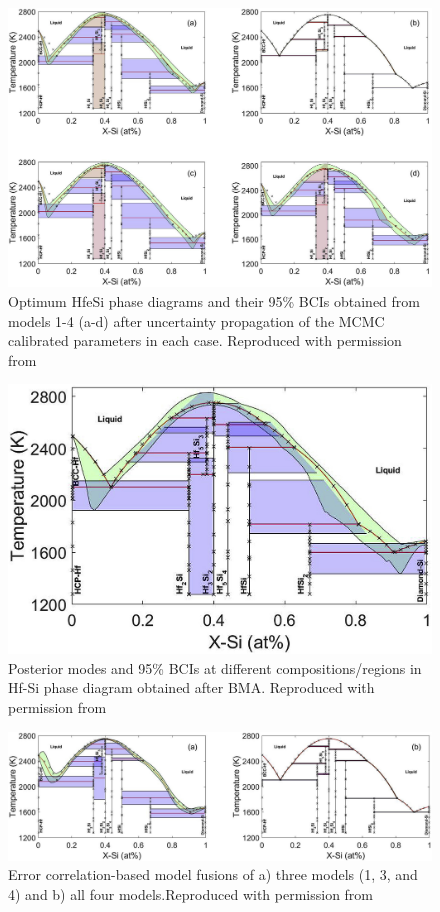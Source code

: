 \documentclass[utf8]{frontiersSCNS} %
\begin{document}
\begin{figure}[!]
\includegraphics[scale=1]{./figures/PD_4_MCMC}
\caption{Optimum HfeSi phase diagrams and their 95\% BCIs obtained from models 1-4 (a-d) after uncertainty propagation of the MCMC calibrated parameters in each case. Reproduced with permission from \cite{honarmandi2019bayesian}}
\label{fig:07}
\end{figure}

\begin{figure}[!]
\includegraphics[scale=1]{./figures/PD_BMA}
\caption{Posterior modes and 95\% BCIs at different compositions/regions in Hf-Si phase diagram obtained after BMA.
 Reproduced with permission from \cite{honarmandi2019bayesian}}
\label{fig:08}
\end{figure}

\begin{figure}[!]
\includegraphics[scale=1]{./figures/PD_CMF}
\caption{Error correlation-based model fusions of a) three models (1, 3, and 4) and b) all four models.Reproduced with permission from \cite{honarmandi2019bayesian}}
\label{fig:09}
\end{figure}
\end{document}
